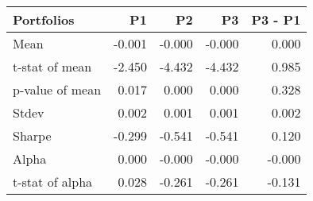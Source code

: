 \begin{tabular}{lrrrr}
\toprule
Portfolios & P1 & P2 & P3 & P3 - P1 \\
\midrule
Mean & -0.001 & -0.000 & -0.000 & 0.000 \\
t-stat of mean & -2.450 & -4.432 & -4.432 & 0.985 \\
p-value of mean & 0.017 & 0.000 & 0.000 & 0.328 \\
Stdev & 0.002 & 0.001 & 0.001 & 0.002 \\
Sharpe & -0.299 & -0.541 & -0.541 & 0.120 \\
Alpha & 0.000 & -0.000 & -0.000 & -0.000 \\
t-stat of alpha & 0.028 & -0.261 & -0.261 & -0.131 \\
\bottomrule
\end{tabular}
